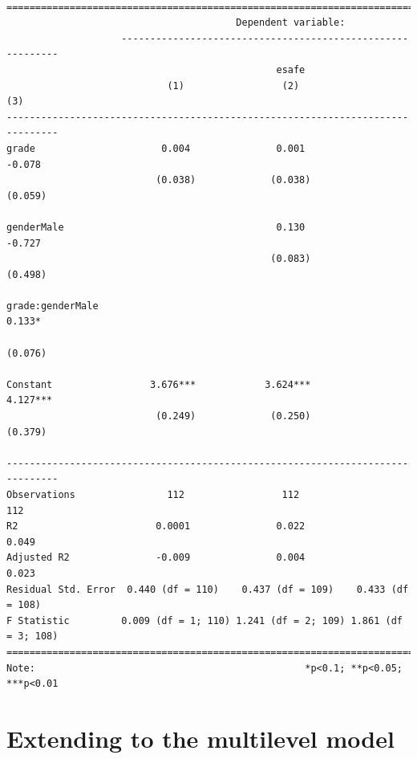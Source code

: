 \documentclass[
  letterpaper,
  DIV=11,
  numbers=noendperiod]{scrreprt}
\begin{document}
\begin{verbatim}

===============================================================================
                                        Dependent variable:                    
                    -----------------------------------------------------------
                                               esafe                           
                            (1)                 (2)                 (3)        
-------------------------------------------------------------------------------
grade                      0.004               0.001              -0.078       
                          (0.038)             (0.038)             (0.059)      
                                                                               
genderMale                                     0.130              -0.727       
                                              (0.083)             (0.498)      
                                                                               
grade:genderMale                                                  0.133*       
                                                                  (0.076)      
                                                                               
Constant                 3.676***            3.624***            4.127***      
                          (0.249)             (0.250)             (0.379)      
                                                                               
-------------------------------------------------------------------------------
Observations                112                 112                 112        
R2                        0.0001               0.022               0.049       
Adjusted R2               -0.009               0.004               0.023       
Residual Std. Error  0.440 (df = 110)    0.437 (df = 109)    0.433 (df = 108)  
F Statistic         0.009 (df = 1; 110) 1.241 (df = 2; 109) 1.861 (df = 3; 108)
===============================================================================
Note:                                               *p<0.1; **p<0.05; ***p<0.01
\end{verbatim}

\hypertarget{extending-to-the-multilevel-model}{%
\section{Extending to the multilevel
model}\label{extending-to-the-multilevel-model}}
\end{document}
